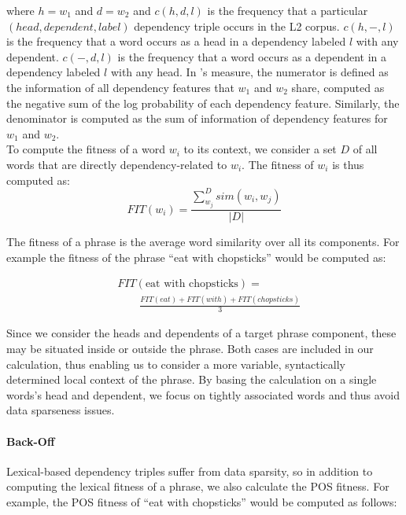 \documentclass[11pt]{article}
\begin{document}
\noindent
where $h=w_1$ and $d=w_2$ and 
$c(h,d,l)$ is the frequency that a particular $(head, dependent, label)$ dependency triple occurs in the L2 corpus. $c(h,-,l)$ is the frequency that a word occurs as a head in a dependency labeled $l$ with any dependent. $c(-,d,l)$ is the frequency that a word occurs as a dependent in a dependency labeled $l$  with any head. 
In \cite{lin:98}'s measure, the numerator is defined as the information of all dependency features that $w_1$ and $w_2$ share, computed as the negative sum of the log probability of each dependency feature. Similarly, the denominator is computed as the sum of information of dependency features for $w_1$ and $w_2$. \\

To compute the fitness of a word $w_i$ to its context, we consider a set $D$ of all words that are directly dependency-related to $w_i$. The fitness of $w_i$ is thus computed as:\\
\begin{equation}
FIT(w_i) =  \frac {  \sum_{w_j}^{D} sim(w_i,w_j) } {  |D|}
\end{equation}

The fitness of a phrase is the average word similarity over all its components. For example the fitness of the phrase ``eat with chopsticks'' would be computed as:

\begin{align}
& FIT(\mbox{eat with chopsticks}) = \nonumber \\
 & \qquad \frac{FIT(eat) + FIT(with) + FIT(chopsticks)}{3}
\end{align}

Since we consider the heads and dependents of a target phrase component, these may be situated  inside or outside the phrase. Both cases are included in our calculation, thus enabling us to consider a more variable, syntactically determined local context of the phrase.
By basing the calculation on a  single words's head and dependent, we focus on  tightly associated words and thus avoid data sparseness issues.

\paragraph{Back-Off}
Lexical-based dependency triples suffer from data sparsity, so in addition to computing the lexical fitness of a phrase, we also calculate the POS fitness. For example, the POS fitness of ``eat with chopsticks'' would be computed as follows:
\end{document}
